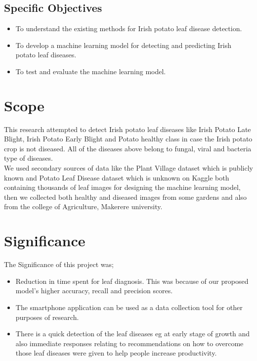 \documentclass[11pt]{report}
\begin{document}
\subsection{Specific Objectives}
	\begin{itemize}
		\item To understand the existing methods for Irish potato leaf disease detection.\\
		\item To develop a machine learning model for detecting and predicting Irish potato leaf diseases.\\
		\item To test and evaluate the machine learning model.\\
	\end{itemize}
\section{Scope}
This research attempted to detect Irish potato leaf diseases like Irish Potato Late Blight, Irish Potato Early Blight and Potato healthy class in case the Irish potato crop is not diseased. All of the diseases above belong to fungal, viral and bacteria type of diseases. \\

We used secondary sources of data like the Plant Village dataset which is publicly known and Potato Leaf Disease dataset which is unknown on Kaggle both containing thousands of leaf images for designing the machine learning model, then we collected both healthy and diseased images from some gardens and also from the college of Agriculture, Makerere university.\\


\section{Significance}

The Significance of this project was;\\
	\begin{itemize}
		\item Reduction in time spent for leaf diagnosis. This was because of our proposed model's higher accuracy, recall and precision scores.\\
		\item The smartphone application can be used as a data collection tool for other purposes of research.\\
		\item There is a quick detection of the leaf diseases eg at early stage of growth and also immediate responses relating to recommendations on how to overcome those leaf diseases were given to help people increase productivity.\\
		
	\end{itemize}
\end{document}
